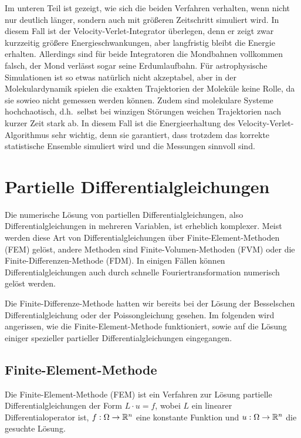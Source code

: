 Im unteren Teil ist gezeigt, wie sich die beiden Verfahren verhalten,
wenn nicht nur deutlich länger, sondern auch mit größeren Zeitschritt
simuliert wird. In diesem Fall ist der Velocity-Verlet-Integrator
überlegen, denn er zeigt zwar kurzzeitig größere Energieschwankungen,
aber langfristig bleibt die Energie erhalten. Allerdings sind für
beide Integratoren die Mondbahnen vollkommen falsch, der Mond verlässt
sogar seine Erdumlaufbahn. Für astrophysische Simulationen ist so
etwas natürlich nicht akzeptabel, aber in der Molekulardynamik spielen
die exakten Trajektorien der Moleküle keine Rolle, da sie sowieo nicht
gemessen werden können. Zudem sind molekulare Systeme hochchaotisch,
d.h.\ selbst bei winzigen Störungen weichen Trajektorien nach kurzer
Zeit stark ab. In diesem Fall ist die Energieerhaltung des
Velocity-Verlet-Algorithmus sehr wichtig, denn sie garantiert, dass
trotzdem das korrekte statistische Ensemble simuliert wird und die
Messungen sinnvoll sind.

\section{Partielle Differentialgleichungen}

Die numerische Lösung von partiellen Differentialgleichungen, also
Differentialgleichungen in mehreren Variablen, ist erheblich
komplexer. Meist werden diese Art von Differentialgleichungen über
Finite-Element-Methoden (FEM) gelöst, andere Methoden sind
Finite-Volumen-Methoden (FVM) oder die Finite-Differenzen-Methode
(FDM). In einigen Fällen können Differentialgleichungen auch durch
schnelle Fouriertransformation numerisch gelöst werden.

Die Finite-Differenze-Methode hatten wir bereits bei der Lösung der
Besselschen Differentialgleichung oder der Poissongleichung gesehen.
Im folgenden wird angerissen, wie die Finite-Element-Methode
funktioniert, sowie auf die Lösung einiger spezieller partieller
Differentialgleichungen eingegangen.

\subsection{Finite-Element-Methode}

Die Finite-Element-Methode (FEM) ist ein Verfahren zur Lösung
partielle Differentialgleichungen der Form $L\cdot u = f$, wobei $L$
ein linearer Differentialoperator ist, $f:\Omega\to\mathbb{R}^n$ eine
konstante Funktion und $u:\Omega\to\mathbb{R}^n$ die gesuchte Lösung.

